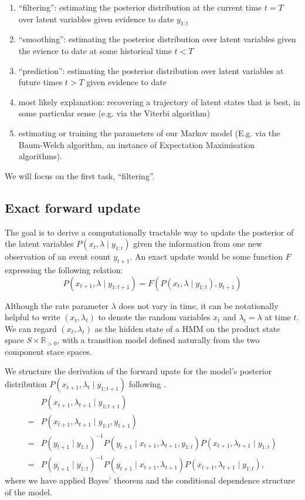 \documentclass[twoside, 11pt]{article}
\newcommand{\reals}[0] {\mathbb{R}}
\begin{document}
\begin{enumerate}
\item ``filtering'': estimating the posterior distribution at the current time $t=T$ over latent variables given evidence to date $y_{1:t}$
\item ``smoothing'': estimating the posterior distribution over latent variables given the evience to date at some historical time $t<T$
\item ``prediction'': estimating the posterior distribution over latent variables at future times $t>T$ given evidence to date
\item most likely explanation: recovering a trajectory of latent states that is best, in some particular sense (e.g. via the Viterbi algorithm)
\item estimating or training the parameters of our Markov model (E.g. via the Baum-Welch algorithm, an instance of Expectation Maximisation algorithms).
\end{enumerate}

We will focus on the first task, ``filtering''.

\subsection{Exact forward update}

The goal is to derive a computationally tractable way to update the posterior of the latent variables $P(x_t, \lambda \mid y_{1:t})$ given the information from one new observation of an event count $y_{t+1}$. An exact update would be some function $F$ expressing the following relation:
\begin{equation}
P(x_{t+1}, \lambda \mid y_{1:t+1}) = F\left( P(x_t, \lambda \mid y_{1:t}), y_{t+1}\right)
\end{equation}

Although the rate parameter $\lambda$ does not vary in time, it can be notationally helpful to write $(x_t, \lambda_t)$ to denote the random variables $x_t$ and $\lambda_t=\lambda$ at time $t$. We can regard $(x_t, \lambda_t)$ as the hidden state of a HMM on the product state space $S \times \reals_{>0}$, with a transition model defined naturally from the two component stace spaces.

We structure the derivation of the forward upate for the model's posterior distribution $P(x_{t+1}, \lambda_t \mid y_{1:{t+1}})$ following \citet*{russell2002artificial}.
\begin{align}
& P(x_{t+1}, \lambda_{t+1} \mid y_{1:{t+1}}) \nonumber \\
= & P(x_{t+1}, \lambda_{t+1} \mid y_{1:t}, y_{t+1}) \nonumber \\
= & P(y_{t+1} \mid y_{1:t})^{-1} P(y_{t+1} \mid x_{t+1}, \lambda_{t+1}, y_{1:t}) P(x_{t+1}, \lambda_{t+1} \mid y_{1:t}) \nonumber \\
= & P(y_{t+1} \mid y_{1:t})^{-1} P(y_{t+1} \mid x_{t+1}, \lambda_{t+1}) P(x_{t+1}, \lambda_{t+1} \mid y_{1:t}) , \label{eqn:rawforward}
\end{align}
where we have applied Bayes' theorem and the conditional dependence structure of the model.
\end{document}
